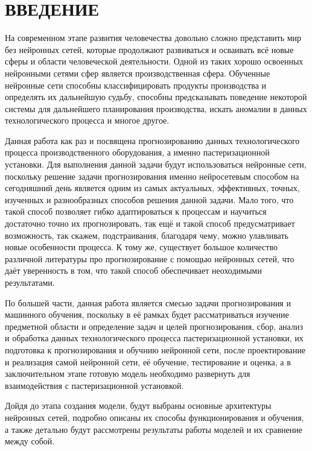\sectionbreak \section*{ 
    \cyrillicfont
    \fontsize{14pt}{24pt}\selectfont 
    \redline
    ВВЕДЕНИЕ
}
\titlespace

{\cyrillicfont
\fontsize{13pt}{16.25pt}\selectfont 
\englishfont 

\par \redline На современном этапе развития человечества довольно сложно представить мир без нейронных сетей, которые продолжают развиваться и осваивать всё новые сферы и области человеческой деятельности. Одной из таких хорошо освоенных нейронными сетями сфер является производственная сфера. Обученные нейронные сети способны классифицировать продукты производства и определять их дальнейшую судьбу, способны предсказывать поведение некоторой системы для дальнейшего планирования производства, искать аномалии в данных технологического процесса и многое другое. 

\par \redline Данная работа как раз и посвящена прогнозированию данных технологического процесса производственного оборудования, а именно пастеризационной установки. Для выполнения данной задачи будут использоваться нейронные сети, поскольку решение задачи прогнозирования именно нейросетевым способом на сегодняшний день является одним из самых актуальных, эффективных, точных, изученных и разнообразных способов решения данной задачи. Мало того, что такой способ позволяет гибко адаптироваться к процессам и научиться достаточно точно их прогнозировать, так ещё и такой способ предусматривает возможность, так скажем, подстраивания, благодаря чему, можно улавливать новые особенности процесса. К тому же, существует большое количество различной литературы про прогнозирование с помощью нейронных сетей, что даёт уверенность в том, что такой способ обеспечивает неоходимыми результатами. 

\par \redline По большей части, данная работа является смесью задачи прогнозирования и машинного обучения, поскольку в её рамках будет рассматриваться изучение предметной области и определение задач и целей прогнозирования, сбор, анализ и обработка данных технологического процесса пастеризационной установки, их подготовка к прогнозирования и обучнию нейронной сети, после проектирование и реализация самой нейронной сети, её обучение, тестирование и оценка, а в заключительном этапе готовую модель необходимо развернуть для взаимодействия с пастеризационной установкой.

\par \redline Дойдя до этапа создания модели, будут выбраны основные архитектуры нейронных сетей, подробно описаны их способы функционирования и обучения, а также детально будут рассмотрены результаты работы моделей и их сравнение между собой.

\par
}
